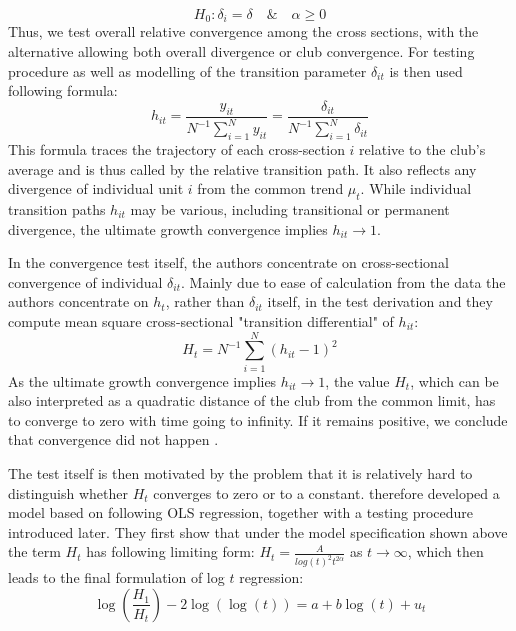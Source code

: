 \documentclass[11pt]{article}
\begin{document}
\begin{equation} \label{eq6} H_0: \delta_{i} = \delta \quad \& \quad \alpha \geq 0 \end{equation} Thus, we test overall relative convergence among the cross sections, with the alternative allowing both overall divergence or club convergence.
For testing procedure as well as modelling of the transition parameter $\delta_{it}$ is then used following formula:
\begin{equation}\label{eq8}h_{it} = \frac{y_{it}}{N^{-1}\sum\limits_{i=1}^Ny_{it}} = \frac{\delta_{it}}{N^{-1}\sum\limits_{i=1}^N\delta_{it}}\end{equation}
This formula traces the trajectory of each cross-section $i$ relative to the club's average and is thus called by \citet{phillips2009economic} the relative transition path. It also reflects any divergence of individual unit $i$ from the common trend $\mu_t$. While individual transition paths $h_{it}$ may be various, including transitional or permanent divergence, the ultimate growth convergence implies \(h_{it} \rightarrow 1\).

In the convergence test itself, the authors concentrate on cross-sectional convergence of individual $\delta_{it}$. Mainly due to ease of calculation from the  data the authors concentrate on $h_{t}$, rather than $\delta_{it}$ itself, in the test derivation and they compute mean square cross-sectional "transition differential" of $h_{it}$:
\begin{equation}\label{eq9}H_t = N^{-1}\sum\limits_{i=1}^N(h_{it} - 1)^2 \end{equation}
As the ultimate growth convergence implies \(h_{it} \rightarrow 1\), the value $H_{t}$, which can be also interpreted as a quadratic distance of the club from the common limit, has to converge to zero with time going to infinity. If it remains positive, we conclude that convergence did not happen \citep{phillips2009economic}.

The test itself is then motivated by the problem that it is relatively hard to distinguish whether $H_t$ converges to zero or to a constant. \citet{phillips2007transition} therefore developed a model based on following OLS regression, together with a testing procedure introduced later. They first show that under the model specification shown above the term $H_{t}$ has following limiting form: \(H_{t} = \frac{A}{log (t)^2t^{2\alpha}}\) as \(t \rightarrow \infty\), which then leads to the final formulation of log $t$ regression:
\begin{equation}\label{eq10}\log(\frac{H_1}{H_t})-2\log(\log(t)) = a + b\log(t) + u_t\end{equation}
\end{document}
